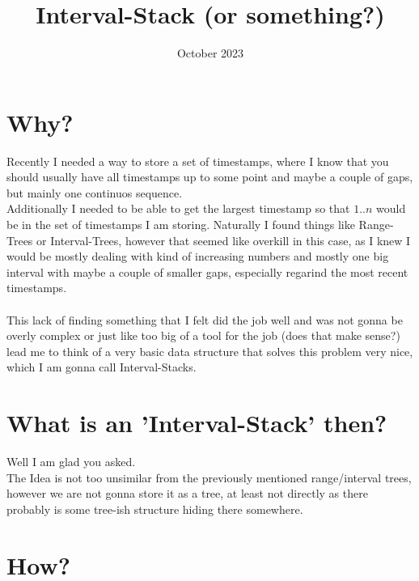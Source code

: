 \documentclass[a4paper, 11pt]{article}
\title{Interval-Stack (or something?)}
\date{October 2023}
\begin{document}
\section{Why?}
Recently I needed a way to store a set of timestamps, where I know that you should usually have all timestamps
up to some point and maybe a couple of gaps, but mainly one continuos sequence. \\
Additionally I needed to be able to get the largest timestamp so that $1..n$ would be in the set of timestamps
I am storing. Naturally I found things like Range-Trees or Interval-Trees, however that seemed like overkill in
this case, as I knew I would be mostly dealing with kind of increasing numbers and mostly one big interval with
maybe a couple of smaller gaps, especially regarind the most recent timestamps. \\
\\
This lack of finding something that I felt did the job well and was not gonna be overly complex or just like too
big of a tool for the job (does that make sense?) lead me to think of a very basic data structure that solves this
problem very nice, which I am gonna call Interval-Stacks.

\section{What is an 'Interval-Stack' then?}
Well I am glad you asked. \\
The Idea is not too unsimilar from the previously mentioned range/interval trees, however we are not gonna store
it as a tree, at least not directly as there probably is some tree-ish structure hiding there somewhere. \\


\section{How?}
\end{document}
